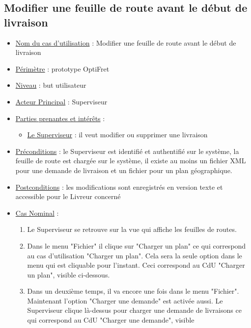 \documentclass[a4paper, 10pt]{article}
\begin{document}
\subsection{Modifier une feuille de route avant le début de livraison}

\begin{itemize}[label = \textbullet, font = \color{orange}]
    \item \underline{Nom du cas d'utilisation} : Modifier une feuille de route
        avant le début de livraison
    \item \underline{Périmètre} : prototype OptiFret
    \item \underline{Niveau} : but utilisateur
    \item \underline{Acteur Principal} : Superviseur
    \item \underline{Parties prenantes et intérêts} :
    \begin{itemize}[label = \textbullet, font = \color{blue}]
        \item \underline{Le Superviseur} : il veut modifier ou supprimer une
            livraison
    \end{itemize}
    \item \underline{Préconditions} : le Superviseur est identifié et
        authentifié sur le système, la feuille de route est chargée sur le
        système, il existe au moins un fichier XML pour une demande de
        livraison et un fichier pour un plan géographique.
    \item \underline{Postconditions} : les modifications sont enregistrés en
        version texte et accessible pour le Livreur concerné
    \item \underline{Cas Nominal} :
    \begin{enumerate}
        \item Le Superviseur se retrouve sur la vue qui affiche les feuilles de
            routes.
        \item Dans le menu "Fichier" il clique sur "Charger un plan" ce qui
            correspond au cas d'utilisation "Charger un plan". Cela sera la
            seule option dans le menu qui est cliquable pour l'instant. Ceci
            correspond au CdU "Charger un plan", visible ci-dessous.
        \item Dans un deuxième temps, il va encore une fois dans le menu
            "Fichier". Maintenant l'option "Charger une demande" est activée
            aussi. Le Superviseur clique là-dessus pour charger une demande de
            livraisons ce qui correspond au CdU "Charger une demande", visible

\end{enumerate}
\end{itemize}
\end{document}
